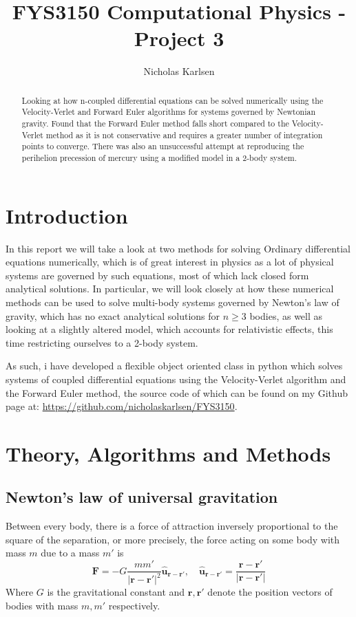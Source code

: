 \documentclass[10pt,showpacs,preprintnumbers,amsmath,amssymb,nofootinbib,aps,prl,twocolumn,groupedaddress,superscriptaddress,showkeys]{revtex4-1}
\begin{document}
\title{FYS3150 Computational Physics - Project 3}
\author{Nicholas Karlsen}


\begin{abstract}
  Looking at how n-coupled differential equations can be solved numerically using the Velocity-Verlet and Forward Euler algorithms for systems governed by Newtonian gravity. Found that the Forward Euler method falls short compared to the Velocity-Verlet method as it is not conservative and requires a greater number of integration points to converge. There was also an unsuccessful attempt at reproducing the perihelion precession of mercury using a modified model in a 2-body system.
\end{abstract}

\maketitle


\section{Introduction}

  In this report we will take a look at two methods for solving Ordinary differential equations numerically, which is of great interest in physics as a lot of physical systems are governed by such equations, most of which lack closed form analytical solutions. In particular, we will look closely at how these numerical methods can be used to solve multi-body systems governed by Newton's law of gravity, which has no exact analytical solutions for $n\geq3$ bodies, as well as looking at a slightly altered model, which accounts for relativistic effects, this time restricting ourselves to a 2-body system.

  As such, i have developed a flexible object oriented class in python which solves systems of coupled differential equations using the Velocity-Verlet algorithm and the Forward Euler method, the source code of which can be found on my Github page at: \url{https://github.com/nicholaskarlsen/FYS3150}. 

\section{Theory, Algorithms and Methods}
  
  \subsection{Newton's law of universal gravitation}
    Between every body, there is a force of attraction inversely proportional to the square of the separation, or more precisely, the force acting on some body with mass $m$ due to a mass $m'$ is
    \begin{equation}
      \mathbf F = -G\frac{m m'}{|\mathbf r - \mathbf r'|^2}\mathbf{\hat{u}_{r-r'}}, \quad \mathbf{\hat{u}_{r-r'}} = \frac{\mathbf r - \mathbf r'}{\mathbf |\mathbf r - \mathbf r'|}
      \label{eqn:newton gravity}
    \end{equation}
    Where $G$ is the gravitational constant and $\mathbf r, \mathbf r'$ denote the position vectors of bodies with mass $m, m'$ respectively.
\end{document}
